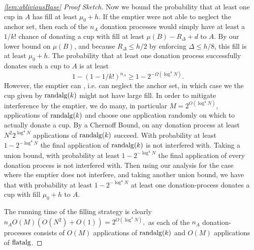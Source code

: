 \begin{proof}[\cref{lem:obliviousBase} Proof Sketch]
Now we bound the probability that at least one cup in $A$ has
fill at least $\mu_0 + h$. If the emptier were not able to
neglect the anchor set, then each of the $n_A$ donation processes
would simply have at least a $1/k!$ chance of donating a cup with
fill at least $\mu(B) - R_\Delta + d$ to $A$. By our lower bound
on $\mu(B)$, and because $R_\Delta \le h/2$ by enforcing $\Delta
\le h/8$, this fill is at least $\mu_0 + h$. The probability that
at least one donation process successfully donates such a cup to
$A$ is at least 
$$1-(1-1/k!)^{n_A} \ge 1-2^{-\Omega(\log^4 N)}.$$
However, the emptier can , i.e. can neglect the
anchor set, in which case we the cup given by $\operatorname{\text{\textup{randalg}}}(k)$ might
not have large fill. In order to mitigate interference by the
emptier, we do many, in particular $M=2^{O(\log^4 N)}$,
applications of $\operatorname{\text{\textup{randalg}}}(k)$ and choose one application randomly
on which to actually donate a cup. By a Chernoff Bound, on any
donation process at least $N^2 2^{\log^4 N}$ applications of $\operatorname{\text{\textup{randalg}}}(k)$
succeed. With probability at least $1-2^{-\log^4 N}$ the final
application of $\operatorname{\text{\textup{randalg}}}(k)$ is not interfered with.
Taking a union bound, with probability at least $1-2^{-\log^4 N}$
the final application of every donation process is not interfered
with. Then using our analysis for the case where the emptier does
not interfere, and taking another union bound, we have that with
probability at least $1-2^{-\log^4 N}$ at least one
donation-process donates a cup with fill $\mu_0 + h$ to $A$.

The running time of the filling strategy is clearly $n_A O(M) (
O(N^2) + O(1)) = 2^{O(\log^4 N)},$ as each of the $n_A$
donation-processes consists of $O(M)$ applications of
$\operatorname{\text{\textup{randalg}}}(k)$ and $O(M)$ applications of $\operatorname{\text{\textup{flatalg}}}$.
\end{proof}

